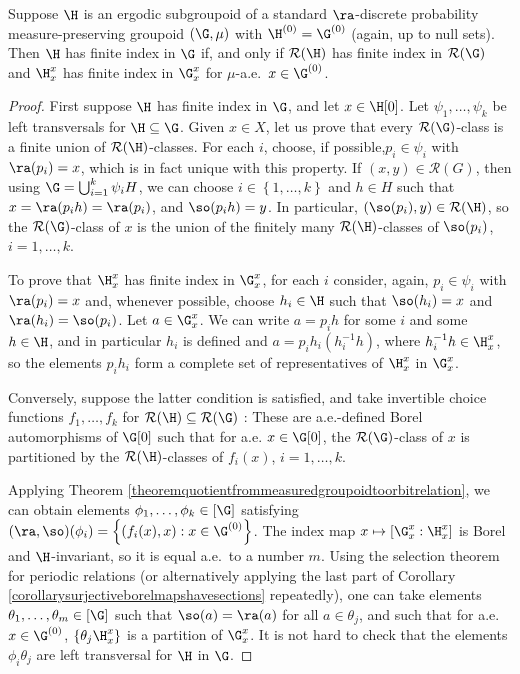 \begin{theorem}
Suppose $\H$ is an ergodic subgroupoid of a standard $\ra$-discrete probability measure-preserving groupoid $(\G,\mu)$ with $\H^{(0)}=\G^{(0)}$ (again, up to null sets). Then $\H$ has finite index in $\G$ if, and only if $\mathcal{R}(\H)$ has finite index in $\mathcal{R}(\G)$ and $\H_x^x$ has finite index in $\G_x^x$ for $\mu$-a.e.\ $x\in \G^{(0)}$.
\end{theorem}
\begin{proof}
First suppose $\H$ has finite index in $\G$, and let $x\in\H[0]$. Let $\psi_1,\ldots,\psi_k$ be left transversals for $\H\subseteq\G$. Given $x\in X$, let us prove that every $\mathcal{R}(\G)$-class is a finite union of $\mathcal{R}(\H)$-classes. For each $i$, choose, if possible,$p_i\in \psi_i$ with $\ra(p_i)=x$, which is in fact unique with this property. If $(x,y)\in\mathcal{R}(G)$, then using $\G=\bigcup_{i=1}^k\psi_i H$, we can choose $i\in\left\{1,\ldots,k\right\}$ and $h\in H$ such that $x=\ra(p_i h)=\ra(p_i)$, and $\so(p_i h)=y$. In particular, $(\so(p_i),y)\in\mathcal{R}(\H)$, so the $\mathcal{R}(\G)$-class of $x$ is the union of the finitely many $\mathcal{R}(\H)$-classes of $\so(p_i)$, $i=1,\ldots,k$.

To prove that $\H_x^x$ has finite index in $\G_x^x$, for each $i$ consider, again, $p_i\in\psi_i$ with $\ra(p_i)=x$ and, whenever possible, choose $h_i\in\H$ such that $\so(h_i)=x$ and $\ra(h_i)=\so(p_i)$. Let $a\in\G^x_x$. We can write $a=p_ih$ for some $i$ and some $h\in\H$, and in particular $h_i$ is defined and $a=p_ih_i(h_i^{-1}h)$, where $h_i^{-1}h\in\H^x_x$, so the elements $p_ih_i$ form a complete set of representatives of $\H^x_x$ in $\G^x_x$.

Conversely, suppose the latter condition is satisfied, and take invertible choice functions $f_1,\ldots,f_k$ for $\mathcal{R}(\H)\subseteq\mathcal{R}(\G)$ \cite[Lemma 1.3]{MR1007409}: These are a.e.-defined Borel automorphisms of $\G[0]$ such that for a.e. $x\in\G[0]$, the $\mathcal{R}(\G)$-class of $x$ is partitioned by the $\mathcal{R}(\H)$-classes of $f_i(x)$, $i=1,\ldots,k$.

Applying Theorem \ref{theoremquotientfrommeasuredgroupoidtoorbitrelation}, we can obtain elements $\phi_1,\ldots,\phi_k\in[\G]$ satisfying $(\ra,\so)(\phi_i)=\left\{(f_i(x),x):x\in\G^{(0)}\right\}$. The index map $x\mapsto [\G_x^x:\H_x^x]$ is Borel and $\H$-invariant, so it is equal a.e.\ to a number $m$. Using the selection theorem for periodic relations \cite[Theorem 12.16]{MR1321597} (or alternatively applying the last part of Corollary \ref{corollarysurjectiveborelmapshavesections} repeatedly), one can take elements $\theta_1,\ldots,\theta_m\in[\G]$ such that $\so(a)=\ra(a)$ for all $a\in\theta_j$, and such that for a.e.\ $x\in\G^{(0)}$, $\left\{\theta_j\H_x^x\right\}$ is a partition of $\G_x^x$. It is not hard to check that the elements $\phi_i\theta_j$ are left transversal for $\H$ in $\G$.\qedhere
\end{proof}


